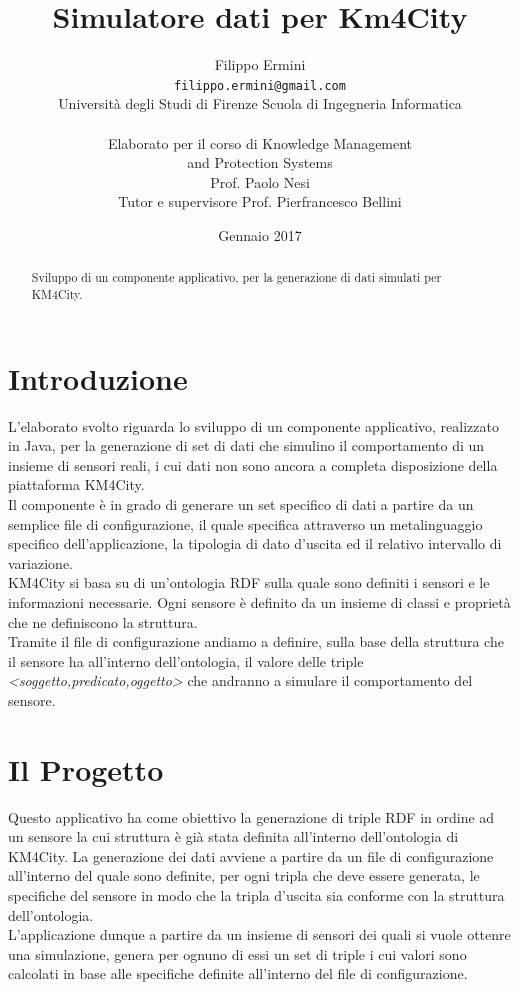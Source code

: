 \documentclass[12pt,a4paper,italian]{article}
\title{\Huge Simulatore dati per Km4City} %
\author{Filippo Ermini\\
	{\tt\small filippo.ermini@gmail.com}\\\small{Università degli Studi di Firenze Scuola di Ingegneria Informatica}\\\\Elaborato per il corso di Knowledge Management \\and Protection Systems\\ Prof. Paolo Nesi\\
	\newline
	\small{Tutor e supervisore Prof. Pierfrancesco Bellini}\\}
\date{Gennaio 2017}
\begin{document}
	\maketitle %
	\thispagestyle{empty}
\begin{abstract}
	Sviluppo di un componente applicativo, per la generazione di dati simulati per KM4City.
\end{abstract}
	\newpage
	\tableofcontents
	\thispagestyle{empty}
	\newpage
	
\section{Introduzione}
\thispagestyle{plain}
L'elaborato svolto riguarda lo sviluppo di un componente applicativo, realizzato in Java, per la generazione di set di dati che simulino il comportamento di un insieme 
di sensori reali, i cui dati non sono ancora a completa disposizione della piattaforma KM4City.\\
Il componente è in grado di generare un set specifico di dati a partire da un semplice file di configurazione, il quale specifica attraverso un metalinguaggio specifico dell'applicazione, 
la tipologia di dato d'uscita ed il relativo intervallo di variazione.\\
KM4City si basa su di un'ontologia RDF sulla quale sono definiti i sensori e le informazioni necessarie. Ogni sensore è definito da un insieme di classi e proprietà che
ne definiscono la struttura.\\
Tramite il file di configurazione andiamo a definire, sulla base della struttura che il sensore ha all'interno dell'ontologia, il valore delle triple \emph{<soggetto,predicato,oggetto>} che andranno
a simulare il comportamento del sensore.

\newpage
\section{Il Progetto}
\thispagestyle{plain}
Questo applicativo ha come obiettivo la generazione di triple RDF in ordine ad un sensore la cui struttura è già stata definita all'interno dell'ontologia di KM4City.
La generazione dei dati avviene a partire da un file di configurazione all'interno del quale sono definite, per ogni tripla che deve essere generata, le specifiche del sensore in modo che 
la tripla d'uscita sia conforme con la struttura dell'ontologia.\\
L'applicazione dunque a partire da un insieme di sensori dei quali si vuole
ottenre una simulazione, genera per ognuno di essi un set di triple i cui valori sono calcolati in base alle specifiche definite all'interno 
del file di configurazione.\\
\end{document}
